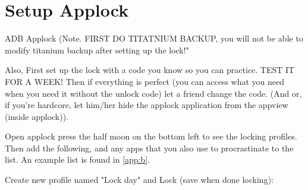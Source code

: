 \section{Setup Applock}\label{sec:ch11}


ADB Applock (Note. FIRST DO TITATNIUM BACKUP, you will not be able to modify titanium backup after setting up the lock!" 

\noindent Also, First set up the lock with a code you know so you can practice. TEST IT FOR A WEEK! Then if everything is perfect (you can access what you need when you need it without the unlock code) let a friend change the code. (And or, if you're hardcore, let him/her hide the applock application from the appview (inside applock)).


\noindent Open applock press the half moon on the bottom left to see the locking profiles. Then add the following, and any apps that you also use to procrastinate to the list. An example list is found in \cref{app:b}.

\newpage
Create new profile named "Lock day" and Lock (save when done locking):

